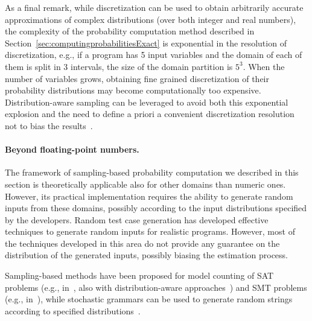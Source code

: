 As a final remark, while discretization can be used to obtain arbitrarily accurate approximations of complex distributions (over both integer and real numbers), the complexity of the probability computation method described in Section~\ref{sec:computingprobabilitiesExact} is exponential in the resolution of discretization, e.g., if a program has 5 input variables and the domain of each of them is split in 3 intervals, the size of the domain partition is $5^3$. When the number of variables grows, obtaining fine grained discretization of their probability distributions may become computationally too expensive. Distribution-aware sampling can be leveraged to avoid both this exponential explosion and the need to define a priori a convenient discretization resolution not to bias the results~\cite{2015-fse-qcoral}.


\paragraph{Beyond floating-point numbers.}
The framework of sampling-based probability computation we described in this section is theoretically applicable also for other domains than numeric ones. However, its practical implementation requires the ability to generate random inputs from these domains, possibly according to the input distributions specified by the developers. Random test case generation has developed effective techniques to generate random inputs for realistic programs. However, most of the techniques developed in this area do not provide any guarantee on the distribution of the generated inputs, possibly biasing the estimation process. 

Sampling-based methods have been proposed for model counting of SAT problems (e.g., in~\cite{satCounting01,biere2009handbook,journalscorrMeel14}, also with distribution-aware approaches~\cite{chakraborty2014distribution}) and SMT problems (e.g., in~\cite{countingSMT}), while stochastic grammars can be used to generate random strings according to specified distributions~\cite{stochasticGrammars}.



